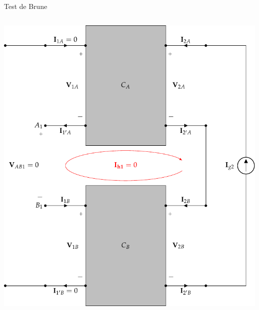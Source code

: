 \documentclass[aspectratio=169, usenames,svgnames,dvipsnames]{beamer}
\begin{document}
\begin{frame}[label={sec:orgb969a12},plain]{Test de Brune}
\begin{columns}
\begin{column}{0.5\columnwidth}
\begin{center}
\includegraphics[height=0.8\textheight]{../figs/serie-serie-brune-salida.pdf}
\end{center}
\end{column}
\end{columns}
\end{frame}
\end{document}
